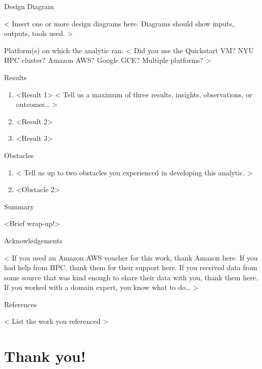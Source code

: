 \documentclass[10pt,ignorenonframetext,]{beamer}
\begin{document}
\begin{frame}{%
\protect\hypertarget{design-diagram}{%
Design Diagram}}

\textless{} Insert one or more design diagrams here. Diagrams should
show inputs, outputs, tools used. \textgreater{}

Platform(s) on which the analytic ran: \textless{} Did you use the
Quickstart VM? NYU HPC cluster? Amazon AWS? Google GCE? Multiple
platforms? \textgreater{}

\end{frame}

\begin{frame}{%
\protect\hypertarget{results}{%
Results}}

\begin{enumerate}
[1.]
\item
  \textless{}Result 1\textgreater{} \textless{} Tell us a maximum of
  three results, insights, observations, or outcomes\ldots{}
  \textgreater{}
\item
  \textless{}Result 2\textgreater{}
\item
  \textless{}Result 3\textgreater{}
\end{enumerate}

\end{frame}

\begin{frame}{%
\protect\hypertarget{obstacles}{%
Obstacles}}

\begin{enumerate}
[1.]
\item
   \textless{} Tell us up to two obstacles you experienced in developing
  this analytic. \textgreater{}
\item
  \textless{}Obstacle 2\textgreater{}
\end{enumerate}

\end{frame}

\begin{frame}{%
\protect\hypertarget{summary}{%
Summary}}

\textless{}Brief wrap-up!\textgreater{}

\end{frame}

\begin{frame}{%
\protect\hypertarget{acknowledgements}{%
Acknowledgements}}

\textless{} If you used an Amazon AWS voucher for this work, thank
Amazon here. If you had help from HPC, thank them for their support
here. If you received data from some source that was kind enough to
share their data with you, thank them here. If you worked with a domain
expert, you know what to do\ldots{} \textgreater{}

\end{frame}

\begin{frame}{%
\protect\hypertarget{references}{%
References}}

\textless{} List the work you referenced \textgreater{}

\end{frame}

\hypertarget{thank-you}{%
\section{Thank you!}\label{thank-you}}
\end{document}
